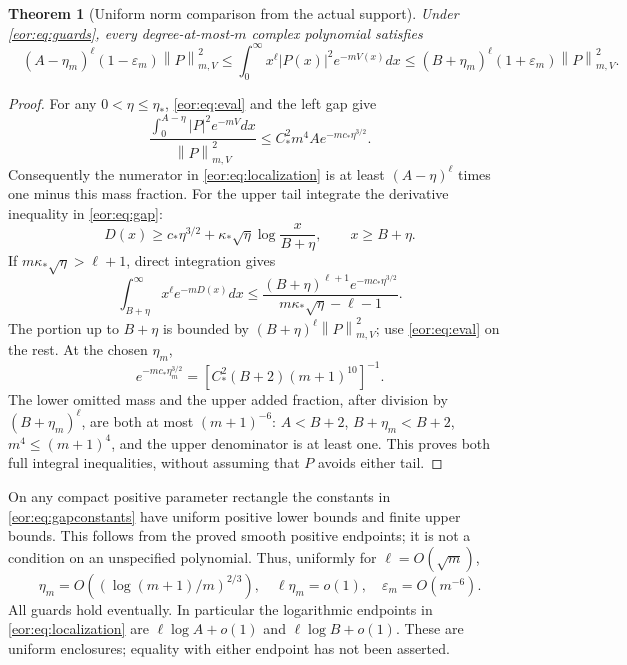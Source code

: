 \documentclass[11pt,a4paper]{article}
\newtheorem{theorem}{Theorem}[section]
\newcommand{\norm}[1]{\left\lVert#1\right\rVert}
\begin{document}
\begin{theorem}[Uniform norm comparison from the actual support]
Under \eqref{eor:eq:guards}, every degree-at-most-$m$ complex polynomial satisfies
\begin{equation}
 \boxed{\quad
 (A-\eta_m)^\ell(1-\varepsilon_m)\norm P_{m,V}^2
 \le\int_0^\infty x^\ell|P(x)|^2e^{-mV(x)}dx
 \le(B+\eta_m)^\ell(1+\varepsilon_m)\norm P_{m,V}^2.
 \quad}\label{eor:eq:localization}
\end{equation}
\end{theorem}
\begin{proof}
For any $0<\eta\le\eta_*$, \eqref{eor:eq:eval} and the left gap give
\[
 \frac{\int_0^{A-\eta}|P|^2e^{-mV}dx}{\norm P_{m,V}^2}
 \le C_*^2m^4 A e^{-mc_*\eta^{3/2}}.
\]
Consequently the numerator in \eqref{eor:eq:localization} is at least
$(A-\eta)^\ell$ times one minus this mass fraction.
For the upper tail integrate the derivative inequality in \eqref{eor:eq:gap}:
\[
 D(x)\ge c_*\eta^{3/2}+\kappa_*\sqrt\eta\log\frac{x}{B+\eta},
 \qquad x\ge B+\eta.
\]
If $m\kappa_*\sqrt\eta>\ell+1$, direct integration gives
\[
 \int_{B+\eta}^\infty x^\ell e^{-mD(x)}dx
 \le\frac{(B+\eta)^{\ell+1}e^{-mc_*\eta^{3/2}}}
                {m\kappa_*\sqrt\eta-\ell-1}.
\]
The portion up to $B+\eta$ is bounded by $(B+\eta)^\ell\norm P_{m,V}^2$;
use \eqref{eor:eq:eval} on the rest. At the chosen $\eta_m$,
\[
 e^{-mc_*\eta_m^{3/2}}
   =[C_*^2(B+2)(m+1)^{10}]^{-1}.
\]
The lower omitted mass and the upper added fraction, after division by
$(B+\eta_m)^\ell$, are both at most $(m+1)^{-6}$:
$A<B+2$, $B+\eta_m<B+2$, $m^4\le(m+1)^4$, and the upper denominator is at
least one. This proves both full integral inequalities, without assuming that
$P$ avoids either tail.
\end{proof}

On any compact positive parameter rectangle the constants in
\eqref{eor:eq:gapconstants} have uniform positive lower bounds and finite upper bounds.
This follows from the proved smooth positive endpoints; it is not a condition
on an unspecified polynomial. Thus, uniformly for $\ell=O(\sqrt m)$,
\begin{equation}
 \eta_m=O((\log(m+1)/m)^{2/3}),\quad
 \ell\eta_m=o(1),\quad \varepsilon_m=O(m^{-6}).
 \label{eor:eq:locasym}
\end{equation}
All guards hold eventually. In particular the logarithmic endpoints in
\eqref{eor:eq:localization} are $\ell\log A+o(1)$ and $\ell\log B+o(1)$.
These are uniform enclosures; equality with either endpoint has not been asserted.
\end{document}
